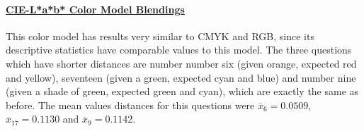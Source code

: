 \paragraph{\ul{CIE-L*a*b* Color Model Blendings}} \par
\label{par:labcolormodel}
%
This color model has results very similar to CMYK and RGB, since its descriptive statistics have comparable values to this model.
The three questions which have shorter distances are number number six (given orange, expected red and yellow), seventeen (given a green, expected cyan and blue) and number nine (given a shade
of green, expected green and cyan), which are exactly the same as before. The mean values distances for this questions were $\overline{x}_{6} = 0.0509$, $\overline{x}_{17} = 0.1130$ and $\overline{x}_{9} = 0.1142$. \par
%
